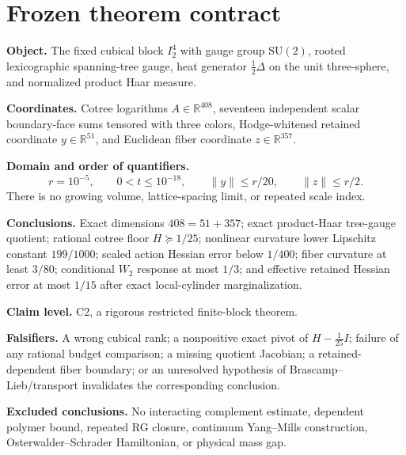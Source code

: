 \section*{Frozen theorem contract}

\textbf{Object.} The fixed cubical block $I_2^4$ with gauge group
$\mathrm{SU}(2)$, rooted lexicographic spanning-tree gauge, heat generator
$\frac12\Delta$ on the unit three-sphere, and normalized product Haar measure.

\textbf{Coordinates.} Cotree logarithms $A\in\mathbb R^{408}$, seventeen
independent scalar boundary-face sums tensored with three colors, Hodge-whitened
retained coordinate $y\in\mathbb R^{51}$, and Euclidean fiber coordinate
$z\in\mathbb R^{357}$.

\textbf{Domain and order of quantifiers.}
\[
 r=10^{-5},\qquad 0<t\le10^{-18},\qquad
 \|y\|\le r/20,\qquad \|z\|\le r/2.
\]
There is no growing volume, lattice-spacing limit, or repeated scale index.

\textbf{Conclusions.} Exact dimensions $408=51+357$; exact product-Haar
tree-gauge quotient; rational cotree floor $H\succeq1/25$; nonlinear curvature
lower Lipschitz constant $199/1000$; scaled action Hessian error below $1/400$;
fiber curvature at least $3/80$; conditional $W_2$ response at most $1/3$; and
effective retained Hessian error at most $1/15$ after exact local-cylinder
marginalization.

\textbf{Claim level.} C2, a rigorous restricted finite-block theorem.

\textbf{Falsifiers.} A wrong cubical rank; a nonpositive exact pivot of
$H-\frac1{25}I$; failure of any rational budget comparison; a missing quotient
Jacobian; a retained-dependent fiber boundary; or an unresolved hypothesis of
Brascamp--Lieb/transport invalidates the corresponding conclusion.

\textbf{Excluded conclusions.} No interacting complement estimate, dependent
polymer bound, repeated RG closure, continuum Yang--Mills construction,
Osterwalder--Schrader Hamiltonian, or physical mass gap.
